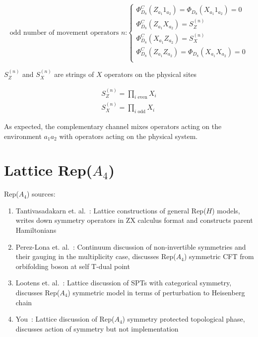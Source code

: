 \documentclass{article}
\theoremstyle{definition}
\begin{document}
\begin{equation} \text{odd number of movement operators $n$:}
\begin{cases}
     \Phi^C_{D_8}(Z_{a_1}1_{a_2}) = \Phi_{D_8}(X_{a_1}1_{a_2}) = 0\\
    \Phi^C_{D_8}(Z_{a_1}X_{a_2}) = S_Z^{(n)}\\
    \Phi^C_{D_8}(X_{a_1}Z_{a_2}) = S_X^{(n)}\\
    \Phi^C_{D_8}(Z_{a_1}Z_{a_2}) = \Phi_{D_8}(X_{a_1}X_{a_2}) = 0 \\
\end{cases} \end{equation}

$ S_Z^{(n)}$ and $ S_X^{(n)}$ are strings of $X$ operators on the physical sites

\begin{eqnarray}
    S_Z^{(n)} = \prod_{i \text{ even}} X_i\\
    S_X^{(n)} = \prod_{i \text{ odd}} X_i
\end{eqnarray}

As expected, the complementary channel mixes operators acting on the environment $a_1a_2$ with operators acting on the physical system.

\section{Lattice Rep($A_4$)}

Rep($A_4$) sources:

\begin{enumerate}
    \item Tantivasadakarn et. al.~\cite{tantivasadakarn2026generalizedkwduality}: Lattice constructions of general Rep($H$) models, writes down symmetry operators in ZX calculus format and constructs parent Hamiltonians
    \item Perez-Lona et. al.~\cite{perezlona2025gaugingnismultiplicity}: Continuum discussion of non-invertible symmetries and their gauging in the multiplicity case, discusses Rep($A_4$) symmetric CFT from orbifolding boson at self T-dual point
    \item Lootens et. al.~\cite{lootens2025entanglementdmrglandau}: Lattice discussion of SPTs with categorical symmetry, discusses Rep($A_4$) symmetric model in terms of perturbation to Heisenberg chain
    \item You~\cite{you2025symmetricentanglersnoninvertiblespt}: Lattice discussion of Rep($A_4$) symmetry protected topological phase, discusses action of symmetry but not implementation
\end{enumerate}
\end{document}
